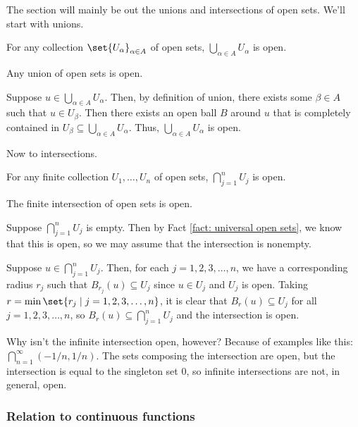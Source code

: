 \documentclass[class=article, crop=false]{standalone}
\begin{document}
The section will mainly be out the unions and intersections of open sets. We'll start with unions.

\begin{thm}
    For any collection $\set{U_\alpha}_{\alpha \in A}$ of open sets, $ \bigcup_{\alpha \in A}^{} U_\alpha$ is open.
\end{thm}
\begin{slogan}
    Any union of open sets is open.
\end{slogan}
\begin{pf}
    Suppose $u \in \bigcup_{\alpha \in A}^{} U_\alpha$. Then, by definition of union, there exists some $\beta \in A$ such that $u \in U_\beta$. Then there exists an open ball $B$ around $u$ that is completely contained in $U_\beta \subseteq  \bigcup_{\alpha \in A}^{} U_\alpha$.
    Thus, $\bigcup_{\alpha \in A}^{} U_\alpha$ is open.
\end{pf}

Now to intersections.
\begin{thm}
    For any finite collection $U_1, \ldots, U_n$ of open sets, $\bigcap_{j=1}^{n} U_j$ is open.
\end{thm}
\begin{slogan}
    The finite intersection of open sets is open.
\end{slogan}
\begin{pf}
    Suppose $\bigcap_{j=1}^{n} U_j$ is empty. Then by Fact \ref{fact: universal open sets}, we know that this is open, so we may assume that the intersection is nonempty.

    Suppose $u \in \bigcap_{j=1}^{n} U_j$. Then, for each $j=1,2,3,\ldots,n$, we have a corresponding radius $r_j$ such that $B_{r_j}(u) \subseteq U_j$ since $u \in U_j$ and $U_j$ is open. Taking $r = \min \set{r_j \mid j=1,2,3,\ldots,n}$, it is clear that $B_r(u) \subseteq U_j$ for
    all $j=1,2,3,\ldots,n$, so $B_r(u) \subseteq \bigcap_{j=1}^{n} U_j$ and the intersection is open.
\end{pf}

Why isn't the infinite intersection open, however? Because of examples like this: $\bigcap_{n=1}^{\infty} (-1/n,1/n)$. The sets composing the intersection are open, but the intersection is equal to the singleton set 0, so infinite intersections are not, in general, open.




\subsubsection*{Relation to continuous functions}
\end{document}
